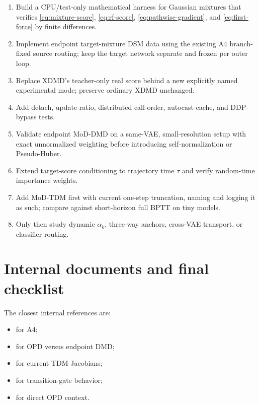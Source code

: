 \documentclass[11pt,a4paper]{article}
\theoremstyle{plain}
\theoremstyle{definition}
\begin{document}
\begin{enumerate}[leftmargin=1.6em]
\item Build a CPU/test-only mathematical harness for Gaussian mixtures that verifies
      \eqref{eq:mixture-score}, \eqref{eq:rf-score}, \eqref{eq:pathwise-gradient}, and
      \eqref{eq:first-force} by finite differences.
\item Implement endpoint target-mixture DSM data using the existing A4 branch-fixed source
      routing; keep the target network separate and frozen per outer loop.
\item Replace XDMD's teacher-only real score behind a new explicitly named experimental mode;
      preserve ordinary XDMD unchanged.
\item Add detach, update-ratio, distributed call-order, autocast-cache, and DDP-bypass tests.
\item Validate endpoint MoD-DMD on a same-VAE, small-resolution setup with exact unnormalized
      weighting before introducing self-normalization or Pseudo-Huber.
\item Extend target-score conditioning to trajectory time $\tau$ and verify random-time importance
      weights.
\item Add MoD-TDM first with current one-step truncation, naming and logging it as such; compare
      against short-horizon full BPTT on tiny models.
\item Only then study dynamic $\alpha_k$, three-way anchors, cross-VAE transport, or classifier
      routing.
\end{enumerate}

\section{Internal documents and final checklist}
\label{sec:references}

The closest internal references are:
\begin{itemize}[leftmargin=1.5em]
\item \href{run:arm_a4_marginal_mixture_cfm_tutorial.pdf}
      {} for A4;
\item \href{run:dmd_opd_gradient_relation.pdf}
      {} for OPD versus endpoint DMD;
\item \href{run:tdm_opd_dm_gradient_relation.tex}
      {} for current TDM Jacobians;
\item \href{run:popd_exact_sum_gate_saturation.pdf}
      {} for transition-gate behavior;
\item \href{run:flow_direct_opd_small_rl_delta_transfer.pdf}
      {} for direct OPD context.
\end{itemize}
\end{document}
